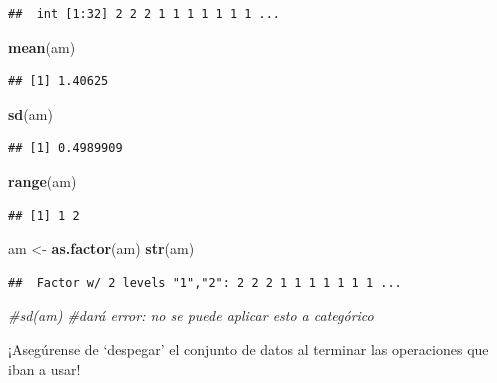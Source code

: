 \documentclass[
]{article}
\newenvironment{Shaded}{\begin{snugshade}}{\end{snugshade}}
\newcommand{\CommentTok}[1]{\textcolor[rgb]{0.56,0.35,0.01}{\textit{#1}}}
\newcommand{\FunctionTok}[1]{\textcolor[rgb]{0.13,0.29,0.53}{\textbf{#1}}}
\newcommand{\NormalTok}[1]{#1}
\newcommand{\OtherTok}[1]{\textcolor[rgb]{0.56,0.35,0.01}{#1}}
\begin{document}
\begin{verbatim}
##  int [1:32] 2 2 2 1 1 1 1 1 1 1 ...
\end{verbatim}

\begin{Shaded}
\begin{Highlighting}[]
\FunctionTok{mean}\NormalTok{(am)}
\end{Highlighting}
\end{Shaded}

\begin{verbatim}
## [1] 1.40625
\end{verbatim}

\begin{Shaded}
\begin{Highlighting}[]
\FunctionTok{sd}\NormalTok{(am)}
\end{Highlighting}
\end{Shaded}

\begin{verbatim}
## [1] 0.4989909
\end{verbatim}

\begin{Shaded}
\begin{Highlighting}[]
\FunctionTok{range}\NormalTok{(am)}
\end{Highlighting}
\end{Shaded}

\begin{verbatim}
## [1] 1 2
\end{verbatim}

\begin{Shaded}
\begin{Highlighting}[]
\NormalTok{am }\OtherTok{\textless{}{-}} \FunctionTok{as.factor}\NormalTok{(am)}
\FunctionTok{str}\NormalTok{(am)}
\end{Highlighting}
\end{Shaded}

\begin{verbatim}
##  Factor w/ 2 levels "1","2": 2 2 2 1 1 1 1 1 1 1 ...
\end{verbatim}

\begin{Shaded}
\begin{Highlighting}[]
\CommentTok{\#sd(am) \#dará error: no se puede aplicar esto a categórico}
\end{Highlighting}
\end{Shaded}

¡Asegúrense de `despegar' el conjunto de datos al terminar las
operaciones que iban a usar!
\end{document}
